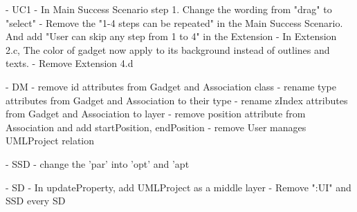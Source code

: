 

- UC1
  - In Main Success Scenario step 1. Change the wording from "drag" to "select"
  - Remove the "1-4 steps can be repeated" in the Main Success Scenario. And add "User can skip any step from 1 to 4" in the Extension
  - In Extension 2.c, The color of gadget now apply to its background instead of outlines and texts.
  - Remove Extension 4.d

- DM
  - remove id attributes from Gadget and Association class
  - rename type attributes from Gadget and Association to their type
  - rename zIndex attributes from Gadget and Association to layer
  - remove position attribute from Association and add startPosition, endPosition
  - remove User manages UMLProject relation

- SSD
  - change the 'par' into 'opt' and 'apt


- SD
  - In updateProperty, add UMLProject as a middle layer
  - Remove ":UI"  and SSD every SD
